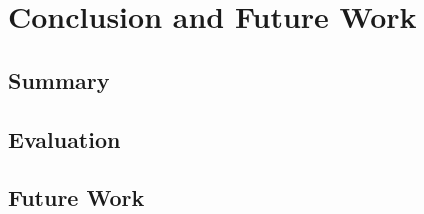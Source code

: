 \documentclass[thesis.tex]{subfiles}
\begin{document}
\chapter{Conclusion and Future Work}

\section{Summary}


\section{Evaluation}


\section{Future Work}


\subfilebib %
\end{document}
